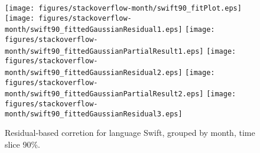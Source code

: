\begin{figure}[t]
\centering
{}
{\texttt{[image: figures/stackoverflow-month/swift90\_fitPlot.eps]}}
{\texttt{[image: figures/stackoverflow-month/swift90\_fittedGaussianResidual1.eps]}}
{\texttt{[image: figures/stackoverflow-month/swift90\_fittedGaussianPartialResult1.eps]}}
{\texttt{[image: figures/stackoverflow-month/swift90\_fittedGaussianResidual2.eps]}}
{\texttt{[image: figures/stackoverflow-month/swift90\_fittedGaussianPartialResult2.eps]}}
{\texttt{[image: figures/stackoverflow-month/swift90\_fittedGaussianResidual3.eps]}}
\caption{Residual-based corretion for language Swift, grouped by month, time slice 90\%.}
\end{figure}


\FloatBarrier


